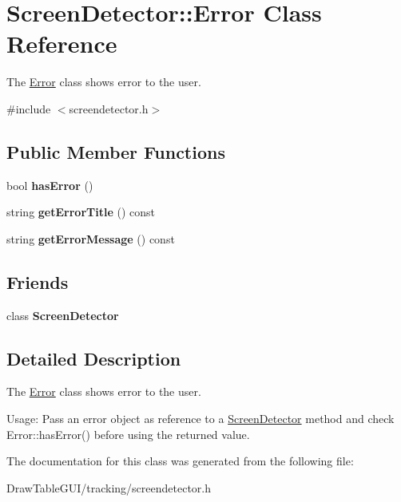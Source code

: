 \hypertarget{classScreenDetector_1_1Error}{}\section{Screen\+Detector\+:\+:Error Class Reference}
\label{classScreenDetector_1_1Error}


The \hyperlink{classScreenDetector_1_1Error}{Error} class shows error to the user.  




{\ttfamily \#include $<$screendetector.\+h$>$}

\subsection*{Public Member Functions}
\begin{DoxyCompactItemize}
\item 
\hypertarget{classScreenDetector_1_1Error_ac7bacaaee1e0a008bb2b7fb984781a18}{}bool {\bfseries has\+Error} ()\label{classScreenDetector_1_1Error_ac7bacaaee1e0a008bb2b7fb984781a18}

\item 
\hypertarget{classScreenDetector_1_1Error_a21f6b0178432ed4956a1e68725941039}{}string {\bfseries get\+Error\+Title} () const \label{classScreenDetector_1_1Error_a21f6b0178432ed4956a1e68725941039}

\item 
\hypertarget{classScreenDetector_1_1Error_a3e55f5b3273ba302043f9adadb6040fa}{}string {\bfseries get\+Error\+Message} () const \label{classScreenDetector_1_1Error_a3e55f5b3273ba302043f9adadb6040fa}

\end{DoxyCompactItemize}
\subsection*{Friends}
\begin{DoxyCompactItemize}
\item 
\hypertarget{classScreenDetector_1_1Error_ab0e771952e70f56935808c8af2695cad}{}class {\bfseries Screen\+Detector}\label{classScreenDetector_1_1Error_ab0e771952e70f56935808c8af2695cad}

\end{DoxyCompactItemize}


\subsection{Detailed Description}
The \hyperlink{classScreenDetector_1_1Error}{Error} class shows error to the user. 

Usage\+: Pass an error object as reference to a \hyperlink{classScreenDetector}{Screen\+Detector} method and check Error\+::has\+Error() before using the returned value. 

The documentation for this class was generated from the following file\+:\begin{DoxyCompactItemize}
\item 
Draw\+Table\+G\+U\+I/tracking/screendetector.\+h\end{DoxyCompactItemize}
